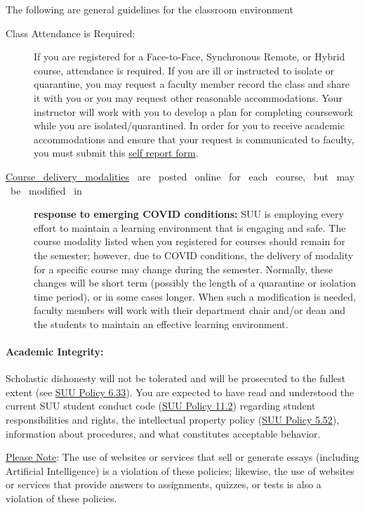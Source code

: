 \documentclass[12pt, letterpaper]{article}
\begin{document}
\noindent The following are general guidelines for the classroom environment
\begin{description}
	\item[Class Attendance is Required:] If you are registered for a Face-to-Face, Synchronous Remote, or Hybrid course, attendance is required. If you are ill or instructed to isolate or quarantine, you may request a faculty member record the class and share it with you or you may request other reasonable accommodations. Your instructor will work with you to develop a plan for completing coursework while you are isolated/quarantined. In order for you to receive academic accommodations and ensure that your request is communicated to faculty, you must submit this \href{https://my.suu.edu/covid/selfreport/}{self report form}.
	\item[\href{https://www.suu.edu/registrar/onlinehybrid.html}{Course ~delivery ~modalities} ~are ~posted ~online ~for ~each ~course, ~but ~may ~be ~modified ~in] \textbf{response to emerging COVID conditions:} SUU is employing every effort to maintain a learning environment that is engaging and safe. The course modality listed when you registered for courses should remain for the semester; however, due to COVID conditions, the delivery of modality for a specific course may change during the semester. Normally, these changes will be short term (possibly the length of a quarantine or isolation time period), or in some cases longer. When such a modification is needed, faculty members will work with their department chair and/or dean and the students to maintain an effective learning environment.
\end{description}

\paragraph{Academic Integrity:}
Scholastic dishonesty will not be tolerated and will be prosecuted to the fullest extent (see \href{https://www.suu.edu/policies/06/33.html}{SUU Policy 6.33}). You are expected to have read and understood the current SUU student conduct code (\href{https://www.suu.edu/policies/11/02.html}{SUU Policy 11.2}) regarding student responsibilities and rights, the intellectual property policy (\href{https://www.suu.edu/policies/05/52.html}{SUU Policy 5.52}), information about procedures, and what constitutes acceptable behavior.

\noindent
\underline{Please Note}: The use of websites or services that sell or generate essays (including Artificial Intelligence) is a violation of these policies; likewise, the use of websites or services that provide answers to assignments, quizzes, or tests is also a violation of these policies.
\end{document}
